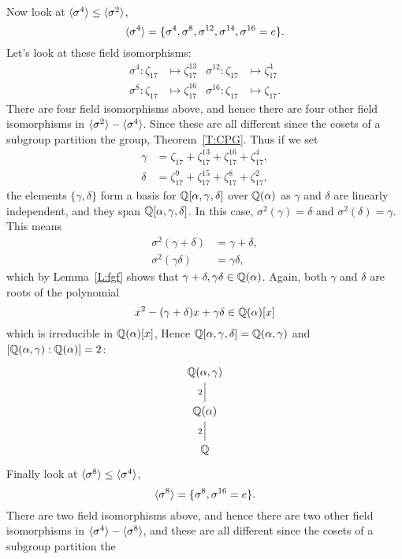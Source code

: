 \documentclass{ximera}
\begin{document}
\begin{example}
\[\begin{tikzcd}
  \end{tikzcd}
  \]
  Now look at $\langle\sigma^4\rangle\leq \langle \sigma^2\rangle$,
  \[
  \langle\sigma^4\rangle = \{ \sigma^4, \sigma^8,\sigma^{12},\sigma^{14},\sigma^{16} = e\}.
  \]
  Let's look at these field isomorphisms:
  \begin{align*}
    \sigma^4: \zeta_{17} &\mapsto \zeta_{17}^{13}    & \sigma^{12}: \zeta_{17} &\mapsto \zeta_{17}^{4}\\
    \sigma^8: \zeta_{17} &\mapsto \zeta_{17}^{16} & \sigma^{16}: \zeta_{17} &\mapsto \zeta_{17}.
  \end{align*}
  There are four field isomorphisms above, and hence there are four
  other field isomorphisms in $\langle\sigma^2\rangle - \langle \sigma^4\rangle$. Since 
  these are all different since the cosets of a subgroup partition the
  group, Theorem~\ref{T:CPG}. Thus if we set
  \begin{align*}
    \gamma &= \zeta_{17}   + \zeta_{17}^{13} + \zeta_{17}^{16} + \zeta_{17}^{4},\\
    \delta &= \zeta_{17}^9 + \zeta_{17}^{15} + \zeta_{17}^{8} + \zeta_{17}^{2},
  \end{align*}
  the elements $\{\gamma,\delta\}$ form a basis for
  $\mathbb Q[\alpha,\gamma,\delta]$ over $\mathbb Q(\alpha)$ as $\gamma$ and
  $\delta$ are linearly independent, and they span
  $\mathbb Q[\alpha,\gamma,\delta]$.  In this case, $\sigma^2(\gamma)= \delta$ and
  $\sigma^2(\delta) = \gamma$. This means
  \begin{align*}
    \sigma^2(\gamma+\delta) &= \gamma + \delta,\\
    \sigma^2(\gamma\delta) &= \gamma\delta,
  \end{align*}
  which by Lemma~\ref{L:fgf} shows that
  $\gamma+\delta,\gamma\delta\in\mathbb Q(\alpha)$. Again, both $\gamma$ and
  $\delta$ are roots of the polynomial
  \[
  x^2 - (\gamma +\delta) x + \gamma\delta\in\mathbb Q(\alpha)[x]
  \]
  which is irreducible in $\mathbb Q(\alpha)[x]$, Hence
  $\mathbb Q[\alpha,\gamma,\delta] = \mathbb Q(\alpha,\gamma)$ and
  $[\mathbb Q(\alpha,\gamma):\mathbb Q(\alpha)] = 2$:
  \[
  \begin{tikzcd}
    \Q(\alpha,\gamma)\\
    \Q(\alpha) \ar[u,-,"2"]\\
    \Q \ar[u,-,"2"]
  \end{tikzcd}
  \]
  Finally look at $\langle\sigma^8\rangle\leq \langle\sigma^4\rangle$,
  \[
  \langle\sigma^8\rangle = \{ \sigma^8,\sigma^{16} = e\}.
  \]
  There are two field isomorphisms above, and hence there are two
  other field isomorphisms in $\langle\sigma^4\rangle - \langle \sigma^8\rangle$, and
  these are all different since the cosets of a subgroup partition the

\end{example}
\end{document}
